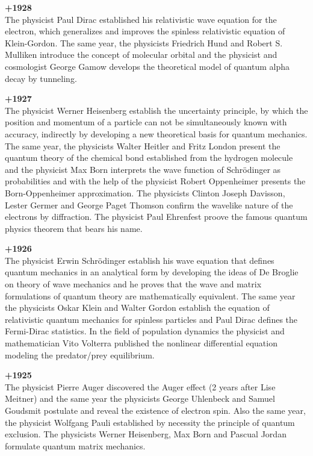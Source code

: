 \textbf{+1928}\\
The physicist Paul Dirac established his relativistic wave equation for the electron, which generalizes and improves the spinless relativistic equation of Klein-Gordon. The same year, the physicists Friedrich Hund and Robert S. Mulliken introduce the concept of molecular orbital and the physicist and cosmologist George Gamow develops the theoretical model of quantum alpha decay by tunneling.

\textbf{+1927}\\
The physicist Werner Heisenberg establish the uncertainty principle, by which the position and momentum of a particle can not be simultaneously known with accuracy, indirectly by developing a new theoretical basis for quantum mechanics. The same year, the physicists Walter Heitler and Fritz London present the quantum theory of the chemical bond established from the hydrogen molecule and the physicist Max Born interprets the wave function of Schrödinger as probabilities and with the help of the physicist Robert Oppenheimer presents the Born-Oppenheimer approximation. The physicists Clinton Joseph Davisson, Lester Germer and George Paget Thomson confirm the wavelike nature of the electrons by diffraction. The physicist Paul Ehrenfest proove the famous quantum physics theorem that bears his name. 

\textbf{+1926}\\
The physicist Erwin Schrödinger establish his wave equation that defines quantum mechanics in an analytical form by developing the ideas of De Broglie on theory of wave mechanics and he proves that the wave and matrix formulations of quantum theory are mathematically equivalent. The same year the physicists Oskar Klein and Walter Gordon establish the equation of relativistic quantum mechanics for spinless particles and Paul Dirac defines the Fermi-Dirac statistics. In the field of population dynamics the physicist and mathematician Vito Volterra published the nonlinear differential equation modeling the predator/prey equilibrium.

\textbf{+1925}\\
The physicist Pierre Auger discovered the Auger effect (2 years after Lise Meitner) and the same year the physicists George Uhlenbeck and Samuel Goudsmit postulate and reveal the existence of electron spin. Also the same year, the physicist Wolfgang Pauli established by necessity the principle of quantum exclusion. The physicists Werner Heisenberg, Max Born and Pascual Jordan formulate quantum matrix mechanics.

